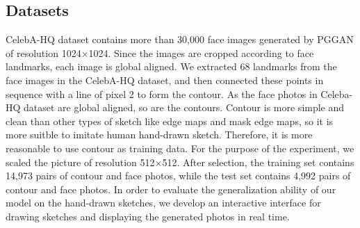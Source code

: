 \documentclass[10pt,twocolumn,letterpaper]{article}
\begin{document}
\subsection{Datasets}\label{sec:datasets} 
CelebA-HQ dataset contains more than 30,000 face images generated by PGGAN\cite{pggan} of resolution 1024×1024. Since the images are cropped according to face landmarks, each image is global aligned. 
We extracted 68 landmarks from the face images in the CelebA-HQ dataset, and then connected these points in sequence with a line of pixel 2 to form the contour. As the face photos in Celeba-HQ dataset are global aligned, so are the contours. Contour is more simple and clean than other types of sketch like edge maps\cite{csagan} and mask edge maps\cite{maskgan}, so it is more suitble to imitate human hand-drawn sketch. Therefore, it is more reasonable to use contour as training data.
For the purpose of the experiment, we scaled the picture of resolution 512×512. After selection, the training set contains 14,973 pairs of contour and face photos, while the test set contains 4,992 pairs of contour and face photos. 
In order to evaluate the generalization ability of our model on the hand-drawn sketches, we develop an interactive interface for drawing sketches and displaying the generated photos in real time.
\end{document}
